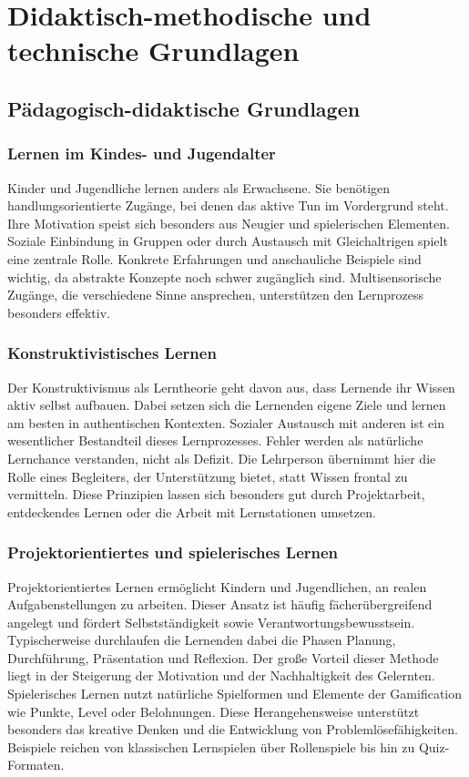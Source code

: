 \chapter{Didaktisch-methodische und technische Grundlagen}
\label{sec:Didaktisch-methodische und technische Grundlagen}

\section{Pädagogisch-didaktische Grundlagen}
\subsection{Lernen im Kindes- und Jugendalter}
Kinder und Jugendliche lernen anders als Erwachsene. Sie benötigen handlungsorientierte Zugänge, bei denen das aktive Tun im Vordergrund steht. Ihre Motivation speist sich besonders aus Neugier und spielerischen Elementen. Soziale Einbindung in Gruppen oder durch Austausch mit Gleichaltrigen spielt eine zentrale Rolle. Konkrete Erfahrungen und anschauliche Beispiele sind wichtig, da abstrakte Konzepte noch schwer zugänglich sind. Multisensorische Zugänge, die verschiedene Sinne ansprechen, unterstützen den Lernprozess besonders effektiv.
\subsection{Konstruktivistisches Lernen}
Der Konstruktivismus als Lerntheorie geht davon aus, dass Lernende ihr Wissen aktiv selbst aufbauen. Dabei setzen sich die Lernenden eigene Ziele und lernen am besten in authentischen Kontexten. Sozialer Austausch mit anderen ist ein wesentlicher Bestandteil dieses Lernprozesses. Fehler werden als natürliche Lernchance verstanden, nicht als Defizit. Die Lehrperson übernimmt hier die Rolle eines Begleiters, der Unterstützung bietet, statt Wissen frontal zu vermitteln. Diese Prinzipien lassen sich besonders gut durch Projektarbeit, entdeckendes Lernen oder die Arbeit mit Lernstationen umsetzen.
\subsection{Projektorientiertes und spielerisches Lernen}
Projektorientiertes Lernen ermöglicht Kindern und Jugendlichen, an realen Aufgabenstellungen zu arbeiten. Dieser Ansatz ist häufig fächerübergreifend angelegt und fördert Selbstständigkeit sowie Verantwortungsbewusstsein. Typischerweise durchlaufen die Lernenden dabei die Phasen Planung, Durchführung, Präsentation und Reflexion. Der große Vorteil dieser Methode liegt in der Steigerung der Motivation und der Nachhaltigkeit des Gelernten. Spielerisches Lernen nutzt natürliche Spielformen und Elemente der Gamification wie Punkte, Level oder Belohnungen. Diese Herangehensweise unterstützt besonders das kreative Denken und die Entwicklung von Problemlösefähigkeiten. Beispiele reichen von klassischen Lernspielen über Rollenspiele bis hin zu Quiz-Formaten.

